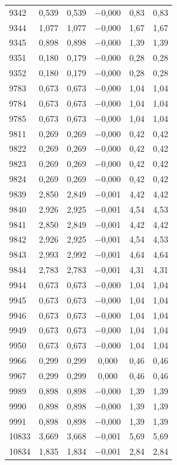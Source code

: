 \begin{longtable}{lccccc}
9342 & 0,539 & 0,539 & $-$0,000 & 0,83 & 0,83 \\
9344 & 1,077 & 1,077 & $-$0,000 & 1,67 & 1,67 \\
9345 & 0,898 & 0,898 & $-$0,000 & 1,39 & 1,39 \\
9351 & 0,180 & 0,179 & $-$0,000 & 0,28 & 0,28 \\
9352 & 0,180 & 0,179 & $-$0,000 & 0,28 & 0,28 \\
9783 & 0,673 & 0,673 & $-$0,000 & 1,04 & 1,04 \\
9784 & 0,673 & 0,673 & $-$0,000 & 1,04 & 1,04 \\
9785 & 0,673 & 0,673 & $-$0,000 & 1,04 & 1,04 \\
9811 & 0,269 & 0,269 & $-$0,000 & 0,42 & 0,42 \\
9822 & 0,269 & 0,269 & $-$0,000 & 0,42 & 0,42 \\
9823 & 0,269 & 0,269 & $-$0,000 & 0,42 & 0,42 \\
9824 & 0,269 & 0,269 & $-$0,000 & 0,42 & 0,42 \\
9839 & 2,850 & 2,849 & $-$0,001 & 4,42 & 4,42 \\
9840 & 2,926 & 2,925 & $-$0,001 & 4,54 & 4,53 \\
9841 & 2,850 & 2,849 & $-$0,001 & 4,42 & 4,42 \\
9842 & 2,926 & 2,925 & $-$0,001 & 4,54 & 4,53 \\
9843 & 2,993 & 2,992 & $-$0,001 & 4,64 & 4,64 \\
9844 & 2,783 & 2,783 & $-$0,001 & 4,31 & 4,31 \\
9944 & 0,673 & 0,673 & $-$0,000 & 1,04 & 1,04 \\
9945 & 0,673 & 0,673 & $-$0,000 & 1,04 & 1,04 \\
9946 & 0,673 & 0,673 & $-$0,000 & 1,04 & 1,04 \\
9949 & 0,673 & 0,673 & $-$0,000 & 1,04 & 1,04 \\
9950 & 0,673 & 0,673 & $-$0,000 & 1,04 & 1,04 \\
9966 & 0,299 & 0,299 & 0,000 & 0,46 & 0,46 \\
9967 & 0,299 & 0,299 & 0,000 & 0,46 & 0,46 \\
9989 & 0,898 & 0,898 & $-$0,000 & 1,39 & 1,39 \\
9990 & 0,898 & 0,898 & $-$0,000 & 1,39 & 1,39 \\
9991 & 0,898 & 0,898 & $-$0,000 & 1,39 & 1,39 \\
10833 & 3,669 & 3,668 & $-$0,001 & 5,69 & 5,69 \\
10834 & 1,835 & 1,834 & $-$0,001 & 2,84 & 2,84 \\

\end{longtable}
